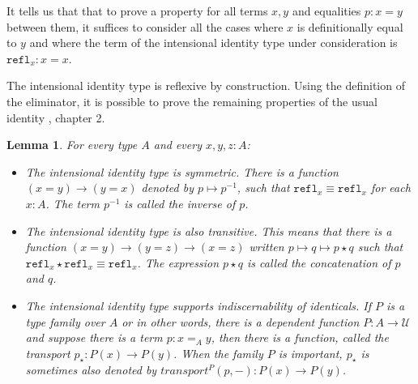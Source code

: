 \documentclass[11pt,a4paper,twoside,xetex,draft]{book}
\newcommand{\keyword}[1]{\emph{#1}\index{#1}}
\newtheorem{lemma}[theorem]{Lemma}
\newcommand{\op}[1]{\mathtt{#1}}
\begin{document}
It tells us that that to prove a property for all terms $x,y$ and equalities $p:x=y$ between them, it suffices to consider all the cases where $x$ is definitionally equal to $y$ and where the term of the intensional identity type under consideration is $\op{refl}_x : x = x$.






The intensional identity type is reflexive by construction. Using the definition of the eliminator, it is possible to prove the remaining properties of the usual identity \cite{Voevodsky2013}, chapter 2. 

\begin{lemma}
  For every type $A$ and every $x,y,z:A$:
  \begin{itemize}
  \item The intensional identity type is symmetric. There is a function $(x=y)\rightarrow (y=x)$ denoted by $p \mapsto p^{-1}$, such that $\op{refl}_x\equiv \op{refl}_x$ for each $x: A$. The term $p^{-1}$ is called the inverse of $p$.
  \item The intensional identity type is also transitive. This means that there is a function $(x=y)\rightarrow (y=z) \rightarrow (x=z)$ written $p \mapsto q \mapsto p \star q$ such that $\op{refl}_x \star \op{refl}_x \equiv \op{refl}_x$. The expression $ p \star q$ is called the \keyword{concatenation} of $p$ and $q$.
    \item The intensional identity type supports indiscernability of identicals. If $P$ is a type family over $A$ or in other words, there is a dependent function $P:A \rightarrow \mathcal{U}$ and suppose there is a term $p: x=_Ay$, then there is a function, called the transport $p_\star:P(x)\rightarrow P(y)$. When the family $P$ is important, $p_\star$ is sometimes also denoted by $transport^P(p,-):P(x) \rightarrow P(y)$.
    \end{itemize}
\end{lemma}
\end{document}
